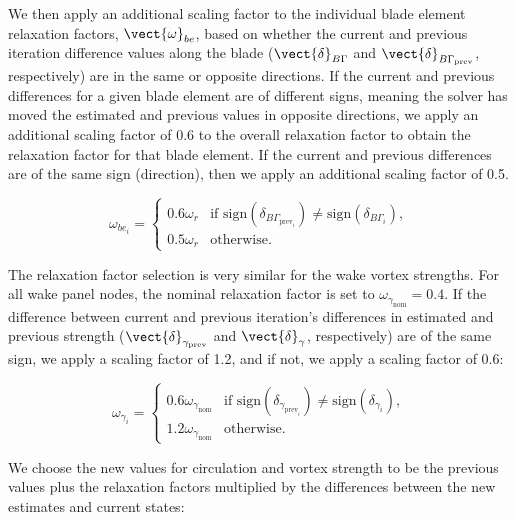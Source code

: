 We then apply an additional scaling factor to the individual blade element relaxation factors, \(\vect{\omega}_{be}\), based on whether the current and previous iteration difference values along the blade (\(\vect{\delta}_{B\Gamma}\) and \(\vect{\delta}_{B\Gamma_\text{prev}}\), respectively) are in the same or opposite directions.
%
If the current and previous differences for a given blade element are of different signs, meaning the solver has moved the estimated and previous values in opposite directions, we apply an additional scaling factor of 0.6 to the overall relaxation factor to obtain the relaxation factor for that blade element.
%
If the current and previous differences are of the same sign (direction), then we apply an additional scaling factor of 0.5.

\begin{equation}
    \label{eqn:circulationrelaxation}
    \omega_{{be}_i} =
    \begin{cases}
        0.6 \omega_r & \text{if } \text{sign}(\delta_{B\Gamma_{\text{prev}_i}}) \neq \text{sign}(\delta_{B\Gamma_i}), \\
        0.5 \omega_r & \text{otherwise}.
    \end{cases}
\end{equation}

The relaxation factor selection is very similar for the wake vortex strengths.
%
For all wake panel nodes, the nominal relaxation factor is set to \(\omega_{\gamma_\text{nom}} = 0.4\).
%
If the difference between current and previous iteration's differences in estimated and previous strength (\(\vect{\delta}_{\gamma_\text{prev}}\) and \(\vect{\delta}_\gamma\), respectively) are of the same sign, we apply a scaling factor of 1.2, and if not, we apply a scaling factor of 0.6:

\begin{equation}
    \label{eqn:gammathetarelaxation}
    \omega_{\gamma_i} =
    \begin{cases}
        0.6\omega_{\gamma_\text{nom}} &\text{if } \text{sign}(\delta_{\gamma_{\text{prev}_i}}) \neq \text{sign}(\delta_{\gamma_i}), \\
        1.2\omega_{\gamma_\text{nom}} & \text{otherwise}.
    \end{cases}
\end{equation}

We choose the new values for circulation and vortex strength to be the previous values plus the relaxation factors multiplied by the differences between the new estimates and current states:

